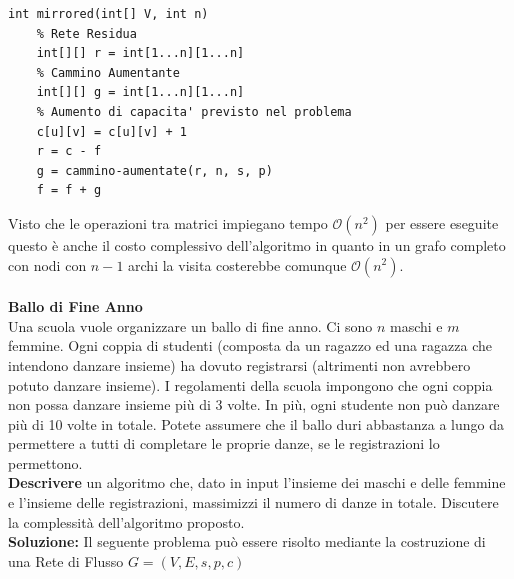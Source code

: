 \documentclass[../cheatSheetAlgoritmi.tex]{subfiles}
\begin{document}
\begin{lstlisting}[caption=Aggiornamento Flusso Massimo]
int mirrored(int[] V, int n)
	% Rete Residua
	int[][] r = int[1...n][1...n]
	% Cammino Aumentante
	int[][] g = int[1...n][1...n]
	% Aumento di capacita' previsto nel problema 
	c[u][v] = c[u][v] + 1
	r = c - f
	g = cammino-aumentate(r, n, s, p)
	f = f + g
\end{lstlisting}
Visto che le operazioni tra matrici impiegano tempo $\mathcal{O}(n^{2})$ per essere eseguite questo è anche il costo complessivo dell'algoritmo in quanto in un grafo completo con nodi con $n-1$ archi la visita costerebbe comunque $\mathcal{O}(n^{2})$.\\\\
\textbf{Ballo di Fine Anno}\\
Una scuola vuole organizzare un ballo di fine anno. Ci sono $n$ maschi e $m$ femmine. Ogni coppia di studenti (composta da un ragazzo ed una ragazza che intendono danzare insieme) ha dovuto registrarsi (altrimenti non avrebbero potuto danzare insieme). I regolamenti della scuola impongono che ogni coppia non possa danzare insieme più di 3 volte. In più, ogni studente non può danzare più di 10 volte in totale. Potete assumere che il ballo duri abbastanza a lungo da permettere a tutti di completare le proprie danze, se le registrazioni lo permettono.\\
\textbf{Descrivere} un algoritmo che, dato in input l’insieme dei maschi e delle femmine e l’insieme delle registrazioni, massimizzi il numero di danze in totale. Discutere la complessità dell’algoritmo proposto.\\
\textbf{Soluzione:} Il seguente problema può essere risolto mediante la costruzione di una Rete di Flusso $G = (V, E, s, p, c)$
\end{document}
